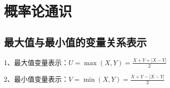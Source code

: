 \chapter{概率论通识}

\section{最大值与最小值的变量关系表示}

1、最大值变量表示：$U=\max (X, Y)=\frac{X+Y+|X-Y|}{2}$



2、最小值变量表示：$V=\min (X, Y)=\frac{X+Y-|X-Y|}{2}$

